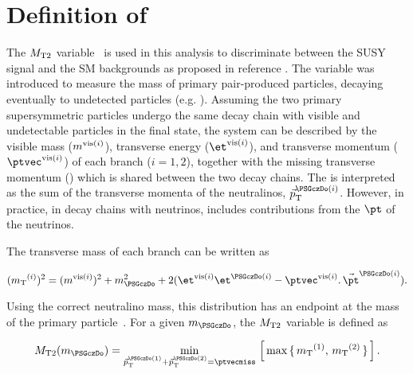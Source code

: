 \section{\texorpdfstring{Definition of \mttwo}{Definition of MT2}}
\label{sect:mt2def}
The ${M_{\rm T2}}$ variable~\cite{Lester:1999tx,Barr:2003rg} is used in this analysis to discriminate between the SUSY signal and the SM backgrounds as proposed in reference \cite{Barr:2009wu}. The variable was introduced to measure the mass of primary pair-produced particles, decaying eventually to undetected particles (e.g. \PSGczDo). Assuming the two primary supersymmetric particles undergo the same decay chain with visible and undetectable particles in the final state, the system can be described by the visible mass ($m^{{\rm vis}(i)}$), transverse energy ($\etvisi$), and transverse momentum ($\vptvisi$) of each branch ($i=1,2$), together with the 
missing transverse momentum (\ptvecmiss) which is shared between the two decay chains. The \ptvecmiss is interpreted as the sum of the transverse momenta
of the neutralinos, $\vec{p}_{\rm T}^{\PSGczDo(i)}$.
However, in practice, in decay chains with neutrinos, \ptvecmiss includes contributions from the $\pt$ of the neutrinos.

The transverse mass of each branch can be written as 
\begin{linenomath}
\begin{equation}
\label{eq:mtdef}
(\mt^{(i)})^{2}= (\mvisi)^2+m^2_{\PSGczDo}+2(\etvisi\et^{\PSGczDo(i)}-{\vptvisi}.\,{\vec{\pt}^{\PSGczDo(i)}}).
\end{equation}
\end{linenomath}

\noindent Using the correct neutralino mass, this distribution has an endpoint at the mass of the primary particle~\cite{Arnison:1983rp,Banner:1983jy,Affolder:2000bpa,Abazov:2002bu}. 
For a given $m_{\PSGczDo}$, the ${M_{\rm T2}}$ variable is defined as
\begin{linenomath}
\begin{equation}
\label{eq:mt2def}
\mttwo(m_{\PSGczDo})= \min_{\vec{p}_{\rm T}^{\PSGczDo(1)}+\vec{p}_{\rm T}^{\PSGczDo(2)}=\ptvecmiss}\,\left[\,\max\,\{ \, \mt^{(1)},\,\mt^{(2)}\,\}\,\right].
\end{equation}
\end{linenomath}

